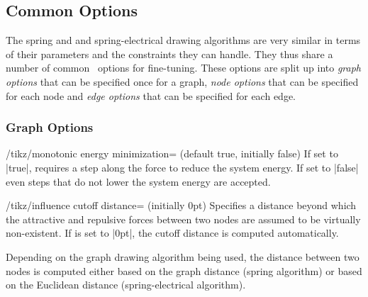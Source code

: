 \subsection{Common Options}

The spring and and spring-electrical drawing algorithms are very similar
in terms of their parameters and the constraints they can handle. They
thus share a number of common \tikzname\ options for fine-tuning. These
options are split up into \emph{graph options} that can be specified
once for a graph, \emph{node options} that can be specified for each
node and \emph{edge options} that can be specified for each edge.

\subsubsection{Graph Options}

\begin{key}{/tikz/monotonic energy minimization= 
  (default true, initially false)}
  If set to |true|, requires a step along the force to reduce the
  system energy. If set to |false| even steps that do not lower the 
  system energy are accepted.
  \begin{codeexample}[]
  \end{codeexample}
\end{key}

\begin{key}{/tikz/influence cutoff distance= (initially
  0pt)}
  Specifies a distance beyond which the attractive and repulsive forces 
  between two nodes are assumed to be virtually non-existent. If 
   is set to |0pt|, the cutoff distance is computed 
  automatically.

  Depending on the graph drawing algorithm being used, the distance
  between two nodes is computed either based on the graph distance
  (spring algorithm) or based on the Euclidean distance
  (spring-electrical algorithm).
  \begin{codeexample}[]
  \end{codeexample}
\end{key}

